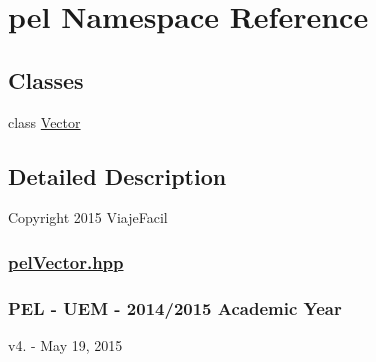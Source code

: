 \hypertarget{namespacepel}{}\section{pel Namespace Reference}
\label{namespacepel}
\subsection*{Classes}
\begin{DoxyCompactItemize}
\item 
class \hyperlink{classpel_1_1Vector}{Vector}
\end{DoxyCompactItemize}


\subsection{Detailed Description}
Copyright 2015 Viaje\+Facil \subsubsection*{\hyperlink{pelVector_8hpp_source}{pel\+Vector.\+hpp} }

\subsubsection*{P\+E\+L -\/ U\+E\+M -\/ 2014/2015 Academic Year }

v4. -\/ May 19, 2015 